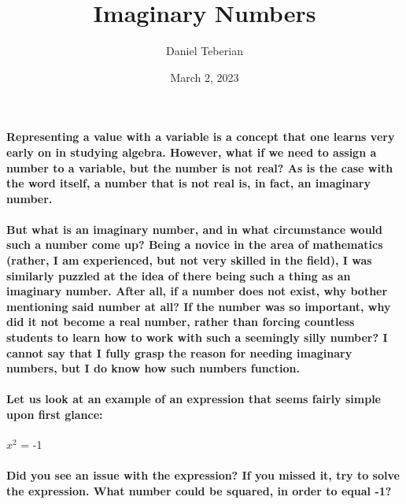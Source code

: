 \documentclass{article}
\begin{document}
\title{Imaginary Numbers}
\author{Daniel Teberian}
\date{March 2, 2023{}}
\maketitle{}

\paragraph{Representing a value with a variable is a concept that one learns very early on in studying algebra. However, what if we need to assign a number to a variable, but the number is not real? As is the case with the word itself, a number that is not real is, in fact, an imaginary number.}

\paragraph{But what is an imaginary number, and in what circumstance would such a number come up? Being a novice in the area of mathematics (rather, I am experienced, but not very skilled in the field), I was similarly puzzled at the idea of there being such a thing as an imaginary number. After all, if a number does not exist, why bother mentioning said number at all? If the number was so important, why did it not become a real number, rather than forcing countless students to learn how to work with such a seemingly silly number? I cannot say that I fully grasp the reason for needing imaginary numbers, but I do know how such numbers function.}

\paragraph{Let us look at an example of an expression that seems fairly simple upon first glance:}
$x^2$ = -1

\paragraph{Did you see an issue with the expression? If you missed it, try to solve the expression. What number could be squared, in order to equal -1?}
\end{document}
